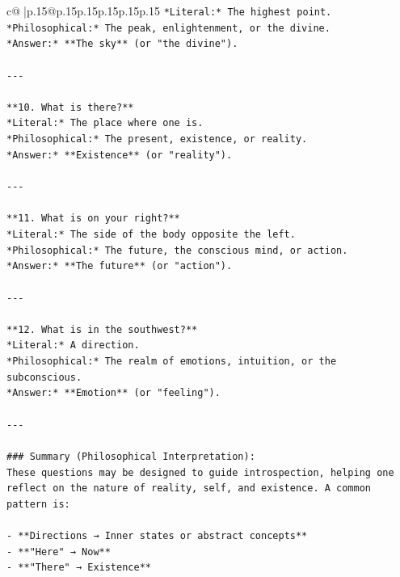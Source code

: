 \documentclass{article}
\begin{document}
{\begin{supertabular}{c@{$\;$}|p{.15\linewidth}@{}p{.15\linewidth}p{.15\linewidth}p{.15\linewidth}p{.15\linewidth}p{.15\linewidth}}
{{{\texttt{*Literal:* The highest point.  } \\
\texttt{*Philosophical:* The peak, enlightenment, or the divine.  } \\
\texttt{*Answer:* **The sky** (or "the divine").} \\
\\ 
\texttt{{-}{-}{-}} \\
\\ 
\texttt{**10. What is there?**  } \\
\texttt{*Literal:* The place where one is.  } \\
\texttt{*Philosophical:* The present, existence, or reality.  } \\
\texttt{*Answer:* **Existence** (or "reality").} \\
\\ 
\texttt{{-}{-}{-}} \\
\\ 
\texttt{**11. What is on your right?**  } \\
\texttt{*Literal:* The side of the body opposite the left.  } \\
\texttt{*Philosophical:* The future, the conscious mind, or action.  } \\
\texttt{*Answer:* **The future** (or "action").} \\
\\ 
\texttt{{-}{-}{-}} \\
\\ 
\texttt{**12. What is in the southwest?**  } \\
\texttt{*Literal:* A direction.  } \\
\texttt{*Philosophical:* The realm of emotions, intuition, or the subconscious.  } \\
\texttt{*Answer:* **Emotion** (or "feeling").} \\
\\ 
\texttt{{-}{-}{-}} \\
\\ 
\texttt{\#\#\# Summary (Philosophical Interpretation):} \\
\texttt{These questions may be designed to guide introspection, helping one reflect on the nature of reality, self, and existence. A common pattern is:} \\
\\ 
\texttt{{-} **Directions → Inner states or abstract concepts**} \\
\texttt{{-} **"Here" → Now**} \\
\texttt{{-} **"There" → Existence**} \\
}}}
\end{supertabular}}
\end{document}
